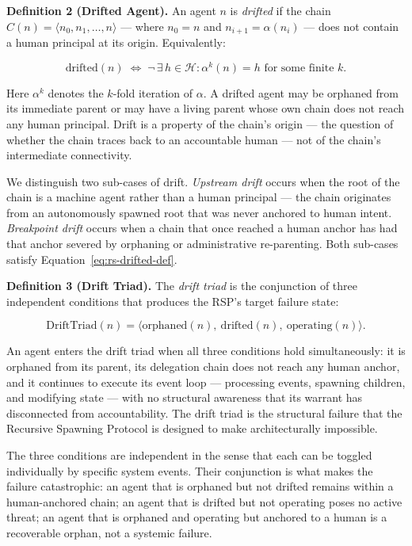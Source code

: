 \medskip
\noindent\textbf{Definition 2 (Drifted Agent).}
An agent $n$ is \emph{drifted} if the chain $C(n) = \langle n_0, n_1, \ldots, n \rangle$ — where $n_0 = n$ and $n_{i+1} = \alpha(n_i)$ — does not contain a human principal at its origin. Equivalently:

\begin{equation}
\mathrm{drifted}(n) \;\iff\; \neg\,\exists\, h \in \mathcal{H} : \alpha^{k}(n) = h \text{ for some finite } k.
\label{eq:rs-drifted-def}
\end{equation}

Here $\alpha^{k}$ denotes the $k$-fold iteration of $\alpha$. A drifted agent may be orphaned from its immediate parent or may have a living parent whose own chain does not reach any human principal. Drift is a property of the chain's origin — the question of whether the chain traces back to an accountable human — not of the chain's intermediate connectivity.

We distinguish two sub-cases of drift. \emph{Upstream drift} occurs when the root of the chain is a machine agent rather than a human principal — the chain originates from an autonomously spawned root that was never anchored to human intent. \emph{Breakpoint drift} occurs when a chain that once reached a human anchor has had that anchor severed by orphaning or administrative re-parenting. Both sub-cases satisfy Equation~\ref{eq:rs-drifted-def}.

\medskip
\noindent\textbf{Definition 3 (Drift Triad).}
The \emph{drift triad} is the conjunction of three independent conditions that produces the RSP's target failure state:

\begin{equation}
\mathrm{DriftTriad}(n) = \langle \mathrm{orphaned}(n),\ \mathrm{drifted}(n),\ \mathrm{operating}(n) \rangle.
\label{eq:rs-drift-triad}
\end{equation}

An agent enters the drift triad when all three conditions hold simultaneously: it is orphaned from its parent, its delegation chain does not reach any human anchor, and it continues to execute its event loop — processing events, spawning children, and modifying state — with no structural awareness that its warrant has disconnected from accountability. The drift triad is the structural failure that the Recursive Spawning Protocol is designed to make architecturally impossible.

The three conditions are independent in the sense that each can be toggled individually by specific system events. Their conjunction is what makes the failure catastrophic: an agent that is orphaned but not drifted remains within a human-anchored chain; an agent that is drifted but not operating poses no active threat; an agent that is orphaned and operating but anchored to a human is a recoverable orphan, not a systemic failure.

